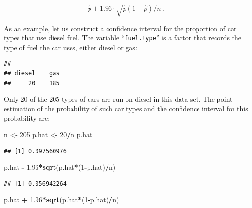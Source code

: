 \documentclass[]{krantz}
\makeatletter
\newenvironment{Shaded}{\begin{snugshade}}{\end{snugshade}}
\newcommand{\DecValTok}[1]{\textcolor[rgb]{0.00,0.00,0.81}{#1}}
\newcommand{\FloatTok}[1]{\textcolor[rgb]{0.00,0.00,0.81}{#1}}
\newcommand{\KeywordTok}[1]{\textcolor[rgb]{0.13,0.29,0.53}{\textbf{#1}}}
\newcommand{\NormalTok}[1]{#1}
\newcommand{\OperatorTok}[1]{\textcolor[rgb]{0.81,0.36,0.00}{\textbf{#1}}}
\newcommand{\StringTok}[1]{\textcolor[rgb]{0.31,0.60,0.02}{#1}}
\newenvironment{kframe}{%
\medskip{}
\setlength{\fboxsep}{.8em}
 \def\at@end@of@kframe{}%
 \ifinner\ifhmode%
  \def\at@end@of@kframe{\end{minipage}}%
  \begin{minipage}{\columnwidth}%
 \fi\fi%
 \def\FrameCommand##1{\hskip\@totalleftmargin \hskip-\fboxsep
 \colorbox{shadecolor}{##1}\hskip-\fboxsep
     \hskip-\linewidth \hskip-\@totalleftmargin \hskip\columnwidth}%
 \MakeFramed {\advance\hsize-\width
   \@totalleftmargin\z@ \linewidth\hsize
   \@setminipage}}%
 {\par\unskip\endMakeFramed%
 \at@end@of@kframe}
\renewenvironment{Shaded}{\begin{kframe}}{\end{kframe}}
\theoremstyle{definition}
\theoremstyle{definition}
\theoremstyle{definition}
\theoremstyle{remark}
\makeatother
\begin{document}
\[\hat p \pm 1.96 \cdot \sqrt{\hat p (1-\hat p)/n}\;.\]

As an example, let us construct a confidence interval for the proportion
of car types that use diesel fuel. The variable ``\texttt{fuel.type}'' is a
factor that records the type of fuel the car uses, either diesel or gas:

\begin{Shaded}
\end{Shaded}

\begin{verbatim}
## 
## diesel    gas 
##     20    185
\end{verbatim}

Only 20 of the 205 types of cars are run on diesel in this data set. The
point estimation of the probability of such car types and the confidence
interval for this probability are:

\begin{Shaded}
\begin{Highlighting}[]
\NormalTok{n <-}\StringTok{ }\DecValTok{205}
\NormalTok{p.hat <-}\StringTok{ }\DecValTok{20}\OperatorTok{/}\NormalTok{n}
\NormalTok{p.hat}
\end{Highlighting}
\end{Shaded}

\begin{verbatim}
## [1] 0.097560976
\end{verbatim}

\begin{Shaded}
\begin{Highlighting}[]
\NormalTok{p.hat }\OperatorTok{-}\StringTok{ }\FloatTok{1.96}\OperatorTok{*}\KeywordTok{sqrt}\NormalTok{(p.hat}\OperatorTok{*}\NormalTok{(}\DecValTok{1}\OperatorTok{-}\NormalTok{p.hat)}\OperatorTok{/}\NormalTok{n)}
\end{Highlighting}
\end{Shaded}

\begin{verbatim}
## [1] 0.056942264
\end{verbatim}

\begin{Shaded}
\begin{Highlighting}[]
\NormalTok{p.hat }\OperatorTok{+}\StringTok{ }\FloatTok{1.96}\OperatorTok{*}\KeywordTok{sqrt}\NormalTok{(p.hat}\OperatorTok{*}\NormalTok{(}\DecValTok{1}\OperatorTok{-}\NormalTok{p.hat)}\OperatorTok{/}\NormalTok{n)}
\end{Highlighting}
\end{Shaded}
\end{document}
